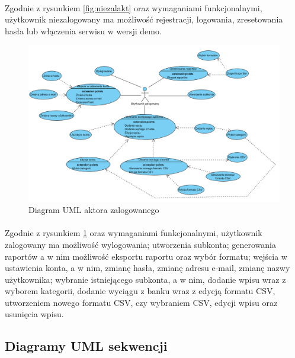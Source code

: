 \documentclass{article}
\begin{document}
	\paragraph*{} Zgodnie z rysunkiem \ref{fig:niezalakt} oraz wymaganiami funkcjonalnymi, użytkownik niezalogowany ma możliwość rejestracji, logowania, zresetowania hasła lub włączenia serwisu w wersji demo.
	\begin{figure}[H]
		\hspace*{-4cm} 
		\includegraphics[scale=0.75]{assets/uml2.png}
		\caption[]{Diagram UML aktora zalogowanego}
		\label{fig:zalakt}
	\end{figure} 
	\paragraph*{} Zgodnie z rysunkiem \ref{fig:zalakt} oraz wymaganiami funkcjonalnymi, użytkownik zalogowany ma możliwość wylogowania; utworzenia subkonta; generowania raportów a w nim możliwość eksportu raportu oraz wybór formatu; wejścia w ustawienia konta, a w nim, zmianę hasła, zmianę adresu e-mail, zmianę nazwy użytkownika; wybranie istniejącego subkonta, a w nim, dodanie wpisu wraz z wyborem kategorii, dodanie wyciągu z banku wraz z edycją formatu CSV, utworzeniem nowego formatu CSV, czy wybraniem CSV, edycji wpisu oraz usunięcia wpisu.
	\subsection{Diagramy UML sekwencji}
\end{document}
